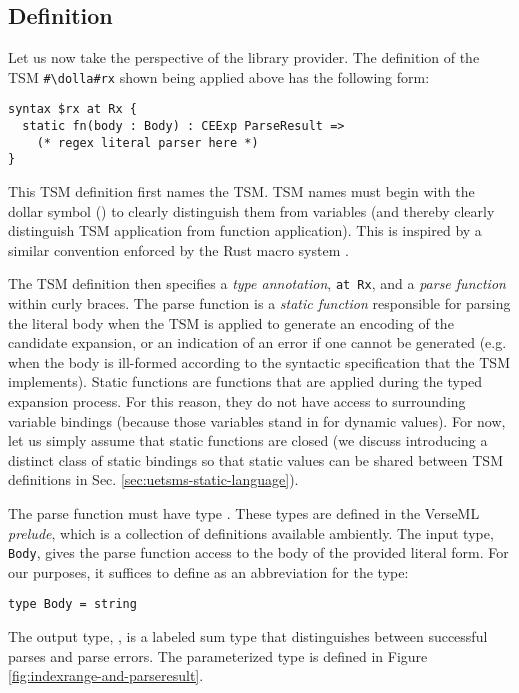 \subsection{Definition}\label{sec:uetsms-definition}
Let us now take the perspective of the library provider. The definition of the TSM \lstinline{#\dolla#rx} shown being applied above has the following form:
\begin{lstlisting}[numbers=none,mathescape=|]
syntax $rx at Rx {
  static fn(body : Body) : CEExp ParseResult => 
    (* regex literal parser here *)
}
\end{lstlisting}
This {TSM definition} first names the TSM. 
 TSM names must begin with the dollar symbol (\li{#\dolla#}) to clearly distinguish them from variables (and thereby clearly distinguish TSM application from function application). This is inspired by a similar convention enforced by the Rust macro system \cite{Rust/Macros}.

The TSM definition then specifies a \emph{type annotation}, \lstinline{at Rx}, and a \emph{parse function} within curly braces. 
The {parse function} is a \emph{static function} responsible for parsing the literal body when the TSM is applied to generate an encoding of the candidate expansion, or an indication of an error if one cannot be generated (e.g. when the body is ill-formed according to the syntactic specification that the TSM implements). Static functions are functions that are applied during the typed expansion process. For this reason, they do not have access to surrounding variable bindings (because those variables stand in for dynamic values). For now, let us simply assume that static functions are closed (we discuss introducing a distinct class of static bindings so that static values can be shared between TSM definitions in Sec. \ref{sec:uetsms-static-language}).

The parse function must have type . These types are defined in the VerseML \emph{prelude}, which is a collection of definitions available ambiently. The input type, \lstinline{Body}, gives the parse function access to the {body} of the provided literal form. For our purposes, it suffices to define  as an abbreviation for the  type:
\begin{lstlisting}[numbers=none]
type Body = string
\end{lstlisting} 

The output type, , is a labeled sum type that distinguishes between successful parses and parse errors. The parameterized type  is defined in Figure \ref{fig:indexrange-and-parseresult}.

